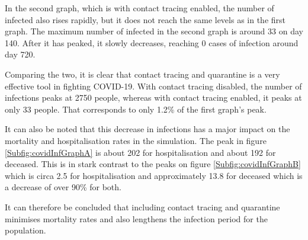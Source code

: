 In the second graph, which is with contact tracing enabled, the number of infected also rises rapidly, but it does not reach the same levels as in the first graph. The maximum number of infected in the second graph is around 33 on day 140. After it has peaked, it slowly decreases, reaching 0 cases of infection around day 720.

Comparing the two, it is clear that contact tracing and quarantine is a very effective tool in fighting COVID-19. With contact tracing disabled, the number of infections peaks at 2750 people, whereas with contact tracing enabled, it peaks at only 33 people. That corresponds to only 1.2\% of the first graph's peak.

It can also be noted that this decrease in infections has a major impact on the mortality and hospitalisation rates in the simulation. The peak in figure \ref{Subfig:covidInfGraphA} is about 202 for hospitalisation and about 192 for deceased. This is in stark contrast to the peaks on figure \ref{Subfig:covidInfGraphB} which is circa 2.5 for hospitalisation and approximately 13.8 for deceased which is a decrease of over 90\% for both.

It can therefore be concluded that including contact tracing and quarantine minimises mortality rates and also lengthens the infection period for the population.


